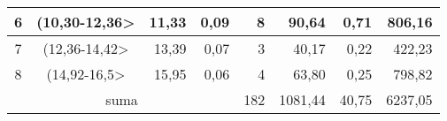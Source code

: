 \begin{table}[H]
{\begin{tabular}{|c|c|r|r|r|r|r|r|}
6                                                                   & (10,30-12,36\textgreater{} & 11,33                          & 0,09                                      & 8                          & 90,64                                    & 0,71                                              & 806,16                                                           \\ \hline
7                                                                   & (12,36-14,42\textgreater{} & 13,39                          & 0,07                                      & 3                          & 40,17                                    & 0,22                                              & 422,23                                                           \\ \hline
8                                                                   & (14,92-16,5\textgreater{}  & 15,95                          & 0,06                                      & 4                          & 63,80                                    & 0,25                                              & 798,82                                                           \\ \hline
\multicolumn{4}{|c|}{suma}                                                                                                                                                    & 182                        & 1081,44                                  & 40,75                                             & 6237,05                                                          \\ \hline
\end{tabular}%
}
\end{table}